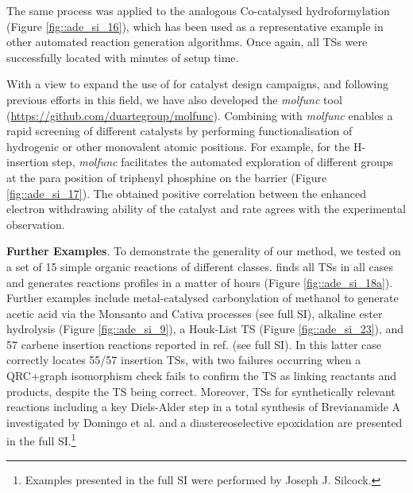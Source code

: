 \documentclass[../../main.tex]{subfiles}
\begin{document}
The same process was applied to the analogous Co-catalysed hydroformylation (Figure \ref{fig::ade_si_16}), which has been used as a representative example in other automated reaction generation algorithms.\cite{Kim2018, Habershon2016, Maeda2012} Once again, all TSs were successfully located with minutes of setup time. 

With a view to expand the use of \ade for catalyst design campaigns, and following previous efforts in this field,\cite{Guan2018} we have also developed the \emph{molfunc} tool \\
({\url{https://github.com/duartegroup/molfunc}}). Combining \ade with \emph{molfunc} enables a rapid screening of different catalysts by performing functionalisation of hydrogenic or other monovalent atomic positions. For example, for the H-insertion step, \emph{molfunc} facilitates the automated exploration of different groups at the para position of triphenyl phosphine on the barrier (Figure \ref{fig::ade_si_17}). The obtained positive correlation between the enhanced electron withdrawing ability of the catalyst and rate agrees with the experimental observation.\cite{Kegl2015} 


{\bfseries{Further Examples}}. To demonstrate the generality of our method, we tested \ade on a set of 15 simple organic reactions of different classes. \ade finds all TSs in all cases and generates reactions profiles in a matter of hours (Figure \ref{fig::ade_si_18a}). Further examples include metal-catalysed carbonylation of methanol to generate acetic acid via the Monsanto and Cativa processes (see full SI),\cite{Jones2000} alkaline ester hydrolysis (Figure \ref{fig::ade_si_9}), a Houk-List TS (Figure \ref{fig::ade_si_23}),\cite{Armstrong2014} and 57 carbene insertion reactions reported in ref. \cite{Mieusset2008} (see full SI). In this latter case \ade correctly locates 55/57 insertion TSs, with two failures occurring when a QRC+graph isomorphism check fails to confirm the TS as linking reactants and products, despite the TS being correct. Moreover, TSs for synthetically relevant reactions including a key Diels-Alder step in a total synthesis of Brevianamide A investigated by Domingo et al.\cite{Domingo1997} and a diastereoselective epoxidation\cite{Schneebeli2009} are presented in the full SI.\footnote{Examples presented in the full SI were performed by Joseph J. Silcock.}
\end{document}
